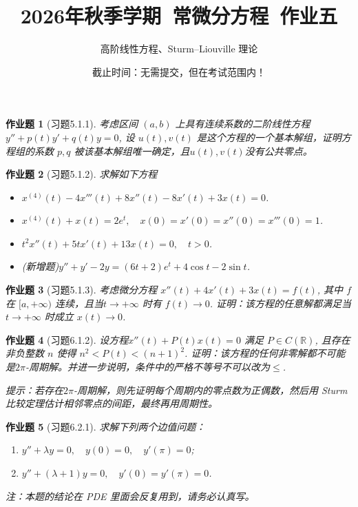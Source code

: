 \documentclass[UTF8,fontset=windows,12pt]{ctexart}
\theoremstyle{kaiti-theorem}
\newtheorem{problem}{作业题}
\numberwithin{equation}{section}
\newcommand{\R}{\mathbb{R}}
\begin{document}
\title{\LARGE{\bf  2026年秋季学期~常微分方程~作业五}}
\author{高阶线性方程、Sturm--Liouville 理论}
\date{截止时间：无需提交，但在考试范围内！}

\maketitle



\begin{problem}[习题5.1.1]
考虑区间 $(a,b)$ 上具有连续系数的二阶线性方程 $y''+p(t)y'+q(t)y=0$, 设 $u(t) ,v(t)$ 是这个方程的一个基本解组，证明方程组的系数 $p,q$ 被该基本解组唯一确定，且$u(t) ,v(t)$没有公共零点。
\end{problem}

\begin{problem}[习题5.1.2] 
求解如下方程
\begin{itemize}
\item [(2)] \(x^{(4)}(t)-4x'''(t)+8x''(t)-8x'(t)+3x(t)=0\).
\item [(3)] \(x^{(4)}(t)+x(t)=2e^t,\quad x(0)=x'(0)=x''(0)=x'''(0)=1\).
\item [(4)] \(t^2x''(t)+5tx'(t)+13x(t)=0,\quad t>0\).
\item [(5)] (新增题)\(y''+y'-2y=(6t+2)e^t+4\cos t-2\sin t\).
\end{itemize}
\end{problem}


\begin{problem}[习题5.1.3]
考虑微分方程 $x''(t)+4x'(t)+3x(t)=f(t)$, 其中 $f$ 在 $[a,+\infty)$ 连续，且当$t\to+\infty$ 时有 $f(t)\to 0$. 证明：该方程的任意解都满足当$t\to+\infty$ 时成立 $x(t)\to 0$.
\end{problem}


\begin{problem}[习题6.1.2]
设方程$x''(t)+P(t)x(t)=0$ 满足 $P\in C(\R)$, 且存在非负整数 $n$ 使得 $n^2<P(t)<(n+1)^2$. 证明：该方程的任何非零解都不可能是$2\pi$-周期解。并进一步说明，条件中的严格不等号不可以改为$\leqslant$.

提示：若存在$2\pi$-周期解，则先证明每个周期内的零点数为正偶数，然后用 Sturm 比较定理估计相邻零点的间距，最终再用周期性。
\end{problem}

\begin{problem}[习题6.2.1]
求解下列两个边值问题：
\begin{enumerate}
    \item [(1)] $y''+\lambda y=0,\quad y(0)=0,\quad y'(\pi)=0$;
    \item [(2)] $y''+(\lambda+1)y=0,\quad y'(0)=y'(\pi)=0$.
\end{enumerate}

注：本题的结论在 PDE 里面会反复用到，请务必认真写。
\end{problem}
\end{document}
